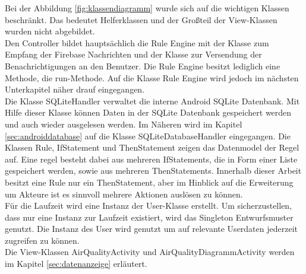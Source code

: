 Bei der Abbildung \ref{fig:klassendiagramm} wurde sich auf die wichtigen Klassen beschränkt. Das bedeutet Helferklassen und der Großteil der View-Klassen wurden nicht abgebildet.\\
Den Controller bildet hauptsächlich die Rule Engine mit der Klasse zum Empfang der Firebase Nachrichten und der Klasse zur Versendung der Benachrichtigungen an den Benutzer. Die Rule Engine besitzt lediglich eine Methode, die run-Methode. Auf die Klasse Rule Engine wird jedoch im nächsten Unterkapitel näher drauf eingegangen.\\
Die Klasse SQLiteHandler verwaltet die interne Android SQLite Datenbank. Mit Hilfe dieser Klasse können Daten in der SQLite Datenbank gespeichert werden und auch wieder ausgelesen werden. Im Näheren wird im Kapitel \ref{sec:androiddatabase} auf die Klasse SQLiteDatabaseHandler eingegangen. Die Klassen Rule, IfStatement und ThenStatement zeigen das Datenmodel der Regel auf. Eine regel besteht dabei aus mehreren IfStatements, die in Form einer Liste gespeichert werden, sowie aus mehreren ThenStatements. Innerhalb dieser Arbeit besitzt eine Rule nur ein ThenStatement, aber im Hinblick auf die Erweiterung um Akteure ist es sinnvoll mehrere Aktionen auslösen zu können.\\
Für die Laufzeit wird eine Instanz der User-Klasse erstellt. Um sicherzustellen, dass nur eine Instanz zur Laufzeit existiert, wird das Singleton Entwurfsmuster genutzt. Die Instanz des User wird genutzt um auf relevante Userdaten jederzeit zugreifen zu können.\\
Die View-Klassen AirQualityActivity und AirQualityDiagrammActivity werden im Kapitel \ref{sec:datenanzeige} erläutert.\\

